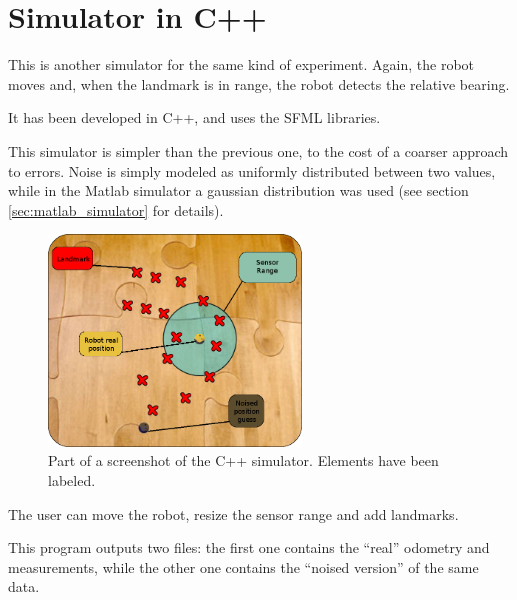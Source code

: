 \section{Simulator in C++}
This is another simulator for the same kind of experiment.
Again, the robot moves and, when the landmark is in range, the robot detects the relative bearing.

It has been developed in C++, and uses the SFML libraries.

This simulator is simpler than the previous one, to the cost of a coarser approach to errors.
Noise is simply modeled as uniformly distributed between two values, while in the Matlab simulator a gaussian distribution was used (see section \ref{sec:matlab_simulator} for details).

\begin{figure}[htbp]
  \centering
    \includegraphics[width=0.6\textwidth]{images/cpp_simulator.png}
  \caption{Part of a screenshot of the C++ simulator. Elements have been labeled.}
  \label{fig:cpp_simulator}
\end{figure}

The user can move the robot, resize the sensor range and add landmarks.

This program outputs two files: the first one contains the ``real'' odometry and measurements, while the other one contains the ``noised version'' of the same data.

